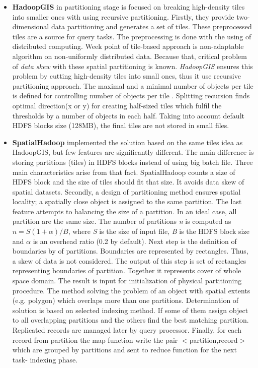 \documentclass[a4paper,12pt,oneside]{report}
\begin{document}
	\begin{itemize}
		\item \textbf{HadoopGIS} in partitioning stage is focused on breaking
		high-density tiles into smaller ones with using 
		recursive partitioning. Firstly, they provide two-dimensional data partitioning
		and generates a set of tiles.
		These preprocessed tiles are a source for query tasks. The preprocessing is done
		with the using of distributed computing.
		Week point of tile-based approach is non-adaptable algorithm on non-uniformly
		distributed data. Because that, 
		critical problem of \textit{data skew} with these spatial partitioning is
		known. \textit{HadoopGIS} ensures 
		this problem by cutting high-density tiles into small ones, thus it use
		recursive partitioning approach. The maximal and a minimal number of objects per
		tile is defined for controlling 
		number of objects per tile . Splitting recursion 
		finds optimal direction(x or y) for creating half-sized tiles which fulfil the
		thresholds by a number of objects 
		in each half.  Taking into account default HDFS blocks size (128MB), the final
		tiles are not stored in small files.
		
		\item  \textbf{SpatialHadoop} implemented the solution  based on the same tiles
		idea as HadoopGIS, but few features 
		are significantly different.
		The main difference is storing partitions (tiles) in HDFS blocks  instead of
		using big batch file. Three main characteristics arise from that fact.
		SpatialHadoop counts 
		a size of HDFS block and the size of tiles should fit that size. It avoids data
		skew of spatial datasets. 
		Secondly, a design of partitioning method ensures spatial locality; a spatially
		close object is assigned to the same 
		partition. The last feature attempts 
		to balancing the size of a partition. In an
		ideal case, all partition are the 
		same size. The number of partitions \emph{n} is computed as $n=S(1+ \alpha)/B$,
		where \emph{S} is the size of input file, \emph{B} is the HDFS block size and
		$\alpha$ is an overhead ratio (0.2 by default). 
		Next step is the definition of boundaries by of partitions. Boundaries are
		represented by rectangles. Thus, a skew of data is not considered. 
		The output of this step is set of rectangles representing  boundaries of
		partition. Together it represents cover 
		of whole space domain. The result is input for initialization of physical
		partitioning procedure. The method solving 
		the problem of an object with spatial extents (e.g. polygon) which overlaps more
		than one partitions. Determination 
		of solution is based on selected indexing method. If some of them assign object
		to all overlapping partitions and 
		the others find the best matching partition. Replicated records are managed
		later by  query processor. Finally, 
		for each record from partition the map function write the pair
		$<$partition,record$>$ which are grouped by 
		partitions and sent to reduce function for the next task- indexing phase.
	\end{itemize}
	
\end{document}
